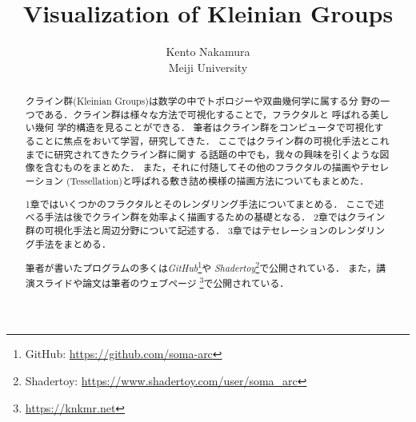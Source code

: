 \documentclass[uplatex, dvipdfmx]{jsarticle}
\title{ Visualization of Kleinian Groups }
\author{ Kento Nakamura\\
Meiji University\\
}
\date{}
\begin{document}
\maketitle

\begin{abstract}
 クライン群(Kleinian Groups)は数学の中でトポロジーや双曲幾何学に属する分
 野の一つである．クライン群は様々な方法で可視化することで，フラクタルと
 呼ばれる美しい幾何 学的構造を見ることができる．
 筆者はクライン群をコンピュータで可視化することに焦点をおいて学習，研究してきた．
 ここではクライン群の可視化手法とこれまでに研究されてきたクライン群に関す
 る話題の中でも，我々の興味を引くような図像を含むものをまとめた．
 また，それに付随してその他のフラクタルの描画やテセレーション
 (Tessellation)と呼ばれる敷き詰め模様の描画方法についてもまとめた．
 
 1章ではいくつかのフラクタルとそのレンダリング手法についてまとめる．
 ここで述べる手法は後でクライン群を効率よく描画するための基礎となる．
 2章ではクライン群の可視化手法と周辺分野について記述する．
 3章ではテセレーションのレンダリング手法をまとめる．

 筆者が書いたプログラムの多くは\textit{GitHub}\footnote{GitHub:
 \url{https://github.com/soma-arc}}や
 \textit{Shadertoy}\footnote{Shadertoy:
 \url{https://www.shadertoy.com/user/soma\_arc}}で公開されている．
 また，講演スライドや論文は筆者のウェブページ
 \footnote{\url{https://knkmr.net}}で公開されている．

\end{abstract}

\clearpage

\tableofcontents

\clearpage







\printbibliography
\end{document}
